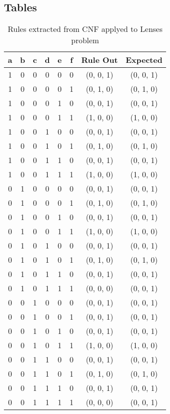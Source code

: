 \begin{appendices}
\chapter{Tables}

\begin{table}[H]
	\begin{center}
		\begin{tabular}{| c | c | c | c | c | c | c | c |}
			\hline
			\textbf{a} & \textbf{b} & \textbf{c} & \textbf{d} & \textbf{e} & \textbf{f} & \textbf{Rule Out} & \textbf{Expected}\\
			\hline
			\hline
			1 & 0 & 0 & 0 & 0 & 0 & (0, 0, 1) & (0, 0, 1)\\\hline
			1 & 0 & 0 & 0 & 0 & 1 & (0, 1, 0) & (0, 1, 0)\\\hline
			1 & 0 & 0 & 0 & 1 & 0 & (0, 0, 1) & (0, 0, 1)\\\hline
			1 & 0 & 0 & 0 & 1 & 1 & (1, 0, 0) & (1, 0, 0)\\\hline
			1 & 0 & 0 & 1 & 0 & 0 & (0, 0, 1) & (0, 0, 1)\\\hline
			1 & 0 & 0 & 1 & 0 & 1 & (0, 1, 0) & (0, 1, 0)\\\hline
			1 & 0 & 0 & 1 & 1 & 0 & (0, 0, 1) & (0, 0, 1)\\\hline
			1 & 0 & 0 & 1 & 1 & 1 & (1, 0, 0) & (1, 0, 0)\\\hline
			0 & 1 & 0 & 0 & 0 & 0 & (0, 0, 1) & (0, 0, 1)\\\hline
			0 & 1 & 0 & 0 & 0 & 1 & (0, 1, 0) & (0, 1, 0)\\\hline
			0 & 1 & 0 & 0 & 1 & 0 & (0, 0, 1) & (0, 0, 1)\\\hline
			0 & 1 & 0 & 0 & 1 & 1 & (1, 0, 0) & (1, 0, 0)\\\hline
			0 & 1 & 0 & 1 & 0 & 0 & (0, 0, 1) & (0, 0, 1)\\\hline
			0 & 1 & 0 & 1 & 0 & 1 & (0, 1, 0) & (0, 1, 0)\\\hline
			0 & 1 & 0 & 1 & 1 & 0 & (0, 0, 1) & (0, 0, 1)\\\hline
			0 & 1 & 0 & 1 & 1 & 1 & (0, 0, 0) & (0, 0, 1)\\\hline
			0 & 0 & 1 & 0 & 0 & 0 & (0, 0, 1) & (0, 0, 1)\\\hline
			0 & 0 & 1 & 0 & 0 & 1 & (0, 0, 1) & (0, 0, 1)\\\hline
			0 & 0 & 1 & 0 & 1 & 0 & (0, 0, 1) & (0, 0, 1)\\\hline
			0 & 0 & 1 & 0 & 1 & 1 & (1, 0, 0) & (1, 0, 0)\\\hline
			0 & 0 & 1 & 1 & 0 & 0 & (0, 0, 1) & (0, 0, 1)\\\hline
			0 & 0 & 1 & 1 & 0 & 1 & (0, 1, 0) & (0, 1, 0)\\\hline
			0 & 0 & 1 & 1 & 1 & 0 & (0, 0, 1) & (0, 0, 1)\\\hline
			0 & 0 & 1 & 1 & 1 & 1 & (0, 0, 0) & (0, 0, 1)\\\hline
		\end{tabular}
	\end{center}
	\caption{Rules extracted from CNF applyed to Lenses problem}
	\label{tab:rule-classification-lenses-cnf}
\end{table}

\end{appendices}
